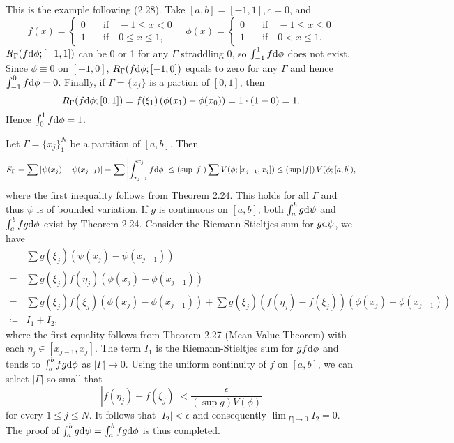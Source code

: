 \begin{exercise}{2.14}
  This is the example following (2.28).
  Take $[a,b] = [-1, 1], c=0$, and
  \[
    f(x) = \left\{
    \begin{aligned}
      0 & \quad \text{if} \quad -1 \le x < 0 \\
      1 & \quad \text{if} \quad 0 \le x \le 1,
    \end{aligned}
    \right.
    \quad
    \phi(x) = \left\{
    \begin{aligned}
      0 & \quad \text{if} \quad -1 \le x \le 0 \\
      1 & \quad \text{if} \quad 0 < x \le 1.
    \end{aligned}
    \right.
  \]
  $R_\Gamma(f\mathrm{d} \phi; [-1, 1])$ can be 0 or 1 for any $\Gamma$ straddling $0$,
  so $\int_{-1}^1 f\mathrm{d} \phi$ does not exist.
  Since $\phi \equiv 0$ on $[-1, 0]$,
  $R_\Gamma(f \mathrm{d} \phi; [-1, 0])$ equals to zero for any $\Gamma$
  and hence $\int_{-1}^0 f \mathrm{d} \phi = 0$.
  Finally, if $\Gamma = \{x_j\}$ is a partion of $[0, 1]$, then
  \[
    R_\Gamma(f \mathrm{d} \phi; [0, 1]) = f(\xi_1) \left( \phi(x_1) - \phi(x_0) \right)
    = 1 \cdot (1-0) = 1.
  \]
  Hence $\int_0^1 f \mathrm{d} \phi = 1$.
\end{exercise}

\begin{exercise}{2.15}
  Let $\Gamma = \{x_j\}_1^N$ be a partition of $[a,b]$. Then
  \[
    S_\Gamma = \sum \left\vert \psi(x_j) - \psi(x_{j-1}) \right\vert
    = \sum \left\vert \int_{x_{j-1}}^{x_j} f \mathrm{d} \phi \right\vert
    \le \left(\sup |f|\right) \sum V(\phi; [x_{j-1}, x_j])
    \le \left(\sup |f|\right) V(\phi; [a,b]),
  \]
  where the first inequality follows from Theorem 2.24.
  This holds for all $\Gamma$ and thus $\psi$ is of bounded variation.
  If $g$ is continuous on $[a,b]$,
  both $\int_a^b g \mathrm{d} \psi$ and $\int_a^b fg \mathrm{d} \phi$ exist
  by Theorem 2.24.
  Consider the Riemann-Stieltjes sum for $g \mathrm{d} \psi$, we have
  \begin{align*}
    & \sum g(\xi_j) \left( \psi(x_j) - \psi(x_{j-1}) \right) \\
    = & \sum g(\xi_j) f(\eta_j) \left( \phi(x_j) - \phi(x_{j-1}) \right) \\
    = & \sum g(\xi_j) f(\xi_j) \left( \phi(x_j) - \phi(x_{j-1}) \right)
    + \sum g(\xi_j) \left( f(\eta_j) - f(\xi_j) \right)
    \left( \phi(x_j) - \phi(x_{j-1}) \right) \\
    \coloneqq & I_1 + I_2,
  \end{align*}
  where the first equality follows from Theorem 2.27 (Mean-Value Theorem)
  with each $\eta_j \in [x_{j-1}, x_j]$.
  The term $I_1$ is the Riemann-Stieltjes sum for $gf \mathrm{d} \phi$
  and tends to $\int_a^b fg \mathrm{d} \phi$ as $|\Gamma| \rightarrow 0$.
  Using the uniform continuity of $f$ on $[a,b]$,
  we can select $|\Gamma|$ so small that
  \[
    \left\vert f(\eta_j) - f(\xi_j) \right\vert <
    \frac{\epsilon} {\left( \sup g \right) V(\phi)}
  \]
  for every $1 \le j \le N$.
  It follows that $|I_2| < \epsilon$
  and consequently $\lim_{|\Gamma| \rightarrow 0} I_2 = 0$.
  The proof of $\int_a^b g \mathrm{d} \psi = \int_a^b fg \mathrm{d} \phi$ is thus completed.

\end{exercise}

